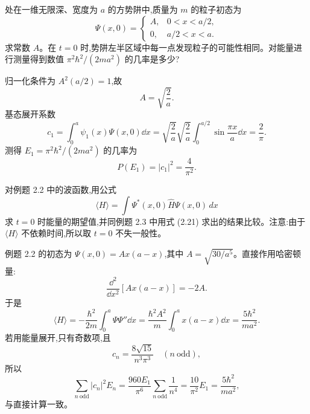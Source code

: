 \begin{question}
处在一维无限深、宽度为 $a$ 的方势阱中,质量为 $m$ 的粒子初态为
\[
\Psi(x,0)=
\begin{cases}
A, & 0<x<a/2,\\
0, & a/2<x<a.
\end{cases}
\]
求常数 $A$。在 $t=0$ 时,势阱左半区域中每一点发现粒子的可能性相同。对能量进行测量得到数值 $\pi^2\hbar^2/(2ma^2)$ 的几率是多少?
\end{question}
\begin{solution}
归一化条件为 $A^2(a/2)=1$,故
\[
A=\sqrt{\frac2a}.
\]
基态展开系数
\[
 c_1=\int_0^a\psi_1(x)\Psi(x,0)\dd x
 =\sqrt{\frac2a}\sqrt{\frac2a}\int_0^{a/2}\sin\frac{\pi x}{a}\dd x
 =\frac2\pi.
\]
测得 $E_1=\pi^2\hbar^2/(2ma^2)$ 的几率为
\[
P(E_1)=|c_1|^2=\frac4{\pi^2}.
\]
\end{solution}

\begin{question}
对例题 2.2 中的波函数,用公式
\[
\langle H\rangle=\int \Psi^*(x,0)\hat H\Psi(x,0)\,dx
\]
求 $t=0$ 时能量的期望值,并同例题 2.3 中用式 (2.21) 求出的结果比较。注意:由于 $\langle H\rangle$ 不依赖时间,所以取 $t=0$ 不失一般性。

\par\smallskip
{}

\end{question}
\begin{solution}
例题 2.2 的初态为 $\Psi(x,0)=A x(a-x)$,其中 $A=\sqrt{30/a^5}$。直接作用哈密顿量:
\[
\frac{\dd^2}{\dd x^2}[Ax(a-x)]=-2A.
\]
于是
\[
\langle H\rangle
=-\frac{\hbar^2}{2m}\int_0^a\Psi\Psi''\dd x
=\frac{\hbar^2A^2}{m}\int_0^a x(a-x)\dd x
=\frac{5\hbar^2}{ma^2}.
\]
若用能量展开,只有奇数项,且
\[
 c_n=\frac{8\sqrt{15}}{n^3\pi^3}\quad(n\ \mathrm{odd}),
\]
所以
\[
\sum_{n\ \mathrm{odd}} |c_n|^2E_n
=\frac{960E_1}{\pi^6}\sum_{n\ \mathrm{odd}}\frac1{n^4}
=\frac{10}{\pi^2}E_1
=\frac{5\hbar^2}{ma^2},
\]
与直接计算一致。
\end{solution}


